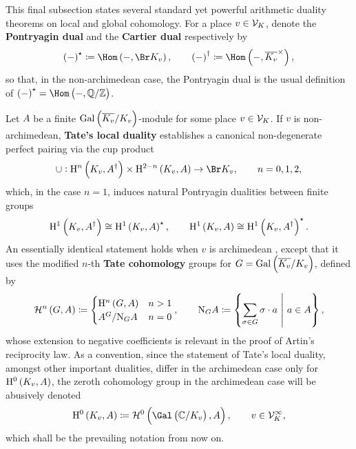This final subsection states several standard yet powerful arithmetic duality theorems on local and global cohomology. For a place $ v \in \mathcal{V}_K $, denote the \textbf{Pontryagin dual} and the \textbf{Cartier dual} respectively by
$$ \br{-}^\star \coloneqq \Hom\br{-, \Br K_v}, \qquad \br{-}^\dagger \coloneqq \Hom\br{-, \overline{K_v}^\times}, $$
so that, in the non-archimedean case, the Pontryagin dual is the usual definition of $ \br{-}^\star = \Hom\br{-, \QQ / \ZZ} $.

Let $ A $ be a finite $ \AG{K_v} $-module for some place $ v \in \mathcal{V}_K $. If $ v $ is non-archimedean, \textbf{Tate's local duality} establishes a canonical non-degenerate perfect pairing via the cup product \cite[Corollary I.2.3]{Mil06}
$$ \cup : \H^n\br{K_v, A^\dagger} \times \H^{2 - n}\br{K_v, A} \to \Br K_v, \qquad n = 0, 1, 2, $$
which, in the case $ n = 1 $, induces natural Pontryagin dualities between finite groups
$$ \H^1\br{K_v, A^\dagger} \cong \H^1\br{K_v, A}^\star, \qquad \H^1\br{K_v, A} \cong \H^1\br{K_v, A^\dagger}^\star. $$
An essentially identical statement holds when $ v $ is archimedean \cite[Theorem I.2.13(a)]{Mil06}, except that it uses the modified $ n $-th \textbf{Tate cohomology} groups for $ G = \AG{K_v} $, defined by
$$ \HHH^n\br{G, A} \coloneqq
\begin{cases}
\H^n\br{G, A} & n > 1 \\
A^G / \N_GA & n = 0
\end{cases},
\qquad \N_GA \coloneqq \cbr{\sum_{\sigma \in G} \sigma \cdot a \st a \in A}, $$
whose extension to negative coefficients is relevant in the proof of Artin's reciprocity law. As a convention, since the statement of Tate's local duality, amongst other important dualities, differ in the archimedean case only for $ \H^0\br{K_v, A} $, the zeroth cohomology group in the archimedean case will be abusively denoted
$$ \H^0\br{K_v, A} \coloneqq \HHH^0\br{\Gal\br{\CC / K_v}, A}, \qquad v \in \VVV_K^\infty, $$
which shall be the prevailing notation from now on.

